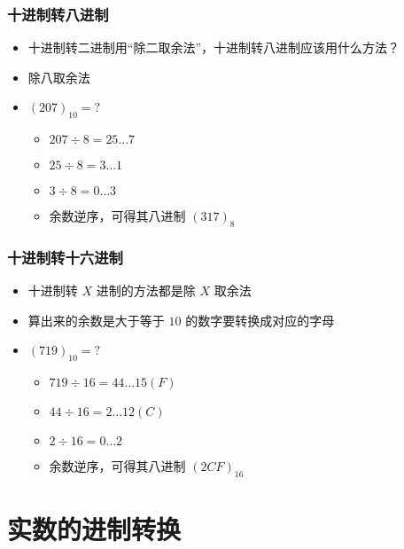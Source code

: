 \begin{frame}[fragile]
    \frametitle{十进制转八进制}

    \begin{itemize}
        \item 十进制转二进制用“除二取余法”，十进制转八进制应该用什么方法？
        \item 除八取余法
        \item $(207)_{10} = ?$
        \begin{itemize}
           \item $207 \div 8 = 25 \dots 7$
           \item $25 \div 8 = 3 \dots 1$
           \item $3 \div 8 = 0 \dots 3$
           \item 余数逆序，可得其八进制 $(317)_8$
        \end{itemize}
    \end{itemize}

\end{frame}

\begin{frame}[fragile]
    \frametitle{十进制转十六进制}

    \begin{itemize}
        \item 十进制转 $X$ 进制的方法都是除 $X$ 取余法
        \item 算出来的余数是大于等于 $10$ 的数字要转换成对应的字母
        \item $(719)_{10} = ?$
        \begin{itemize}
           \item $719 \div 16 = 44 \dots 15(F)$
           \item $44 \div 16 = 2 \dots 12(C)$
           \item $2 \div 16 = 0 \dots 2$
           \item 余数逆序，可得其八进制 $(2CF)_{16}$
        \end{itemize}
    \end{itemize}

\end{frame}

\section{实数的进制转换}

